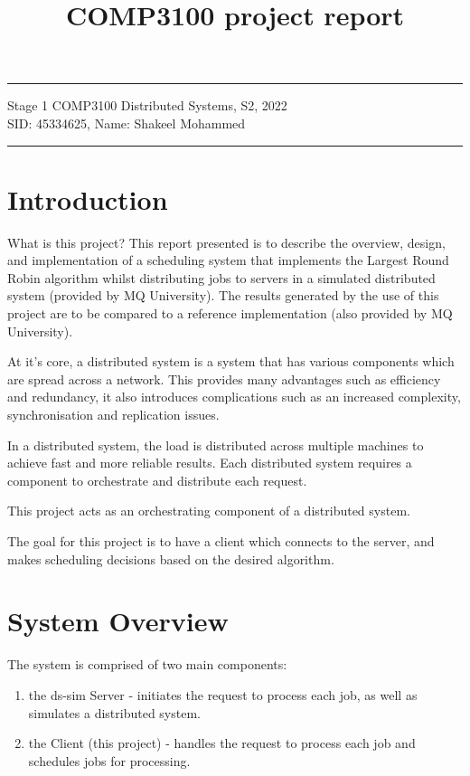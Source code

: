 \documentclass[a4paper]{article}
\begin{document}
\title{COMP3100 project report}
\hrule \medskip %
\begin{minipage}{0.9\textwidth}
\centering 
\large %
Stage 1 COMP3100 Distributed Systems, S2, 2022\\
\normalsize %
SID: 45334625, Name: Shakeel Mohammed
\end{minipage}
\medskip\hrule %
\bigskip

\section{Introduction}
What is this project?
This report presented is to describe the overview, design, and implementation of a scheduling system that implements the Largest Round Robin algorithm whilst distributing jobs to servers in a simulated distributed system (provided by MQ University). The results generated by the use of this project are to be compared to a reference implementation (also provided by MQ University).

At it's core, a distributed system is a system that has various components which are spread across a network. This provides many advantages such as efficiency and redundancy, it also introduces complications such as an increased complexity, synchronisation and replication issues.

In a distributed system, the load is distributed across multiple machines to achieve fast and more reliable results. Each distributed system requires a component to orchestrate and distribute each request.

This project acts as an orchestrating component of a distributed system.

The goal for this project is to have a client which connects to the server, and makes scheduling decisions based on the desired algorithm.

\section{System Overview}
\label{sec:section2}
The system is comprised of two main components:
\begin{enumerate}
  \item the ds-sim Server - initiates the request to process each job, as well as simulates a distributed system.
  \item the Client (this project) - handles the request to process each job and schedules jobs for processing.
\end{enumerate}
\end{document}
